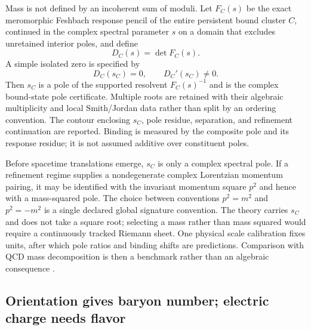 \documentclass[11pt,letterpaper]{article}
\begin{document}
Mass is not defined by an incoherent sum of moduli. Let $F_C(s)$ be the exact
meromorphic Feshbach response pencil of the entire persistent bound cluster
$C$, continued in the complex spectral parameter $s$ on a domain that excludes
unretained interior poles, and define
\begin{equation*}
  D_C(s)=\det F_C(s).
\end{equation*}
A simple isolated zero is specified by
\begin{equation*}
  D_C(s_C)=0,\qquad D_C'(s_C)\ne0.
\end{equation*}
Then $s_C$ is a pole of the supported resolvent $F_C(s)^{-1}$ and is the
complex bound-state pole certificate. Multiple roots are retained with their
algebraic multiplicity and local Smith/Jordan data rather than split by an
ordering convention. The contour enclosing $s_C$, pole residue, separation,
and refinement continuation are reported. Binding is measured by the
composite pole and its response residue; it is not assumed additive over
constituent poles.

Before spacetime translations emerge, $s_C$ is only a complex spectral pole.
If a refinement regime supplies a nondegenerate complex Lorentzian momentum
pairing, it may be identified with the invariant momentum square $p^2$ and
hence with a mass-squared pole. The choice between conventions
$p^2=m^2$ and $p^2=-m^2$ is a single declared global signature convention.
The theory carries $s_C$ and does not take a square root; selecting a mass
rather than mass squared would require a continuously tracked Riemann sheet.
One physical scale calibration fixes units, after which pole ratios and
binding shifts are predictions. Comparison with QCD mass decomposition is then
a benchmark rather than an algebraic consequence \cite{yang2018}.

\subsection{Orientation gives baryon number; electric charge needs flavor}
\end{document}
